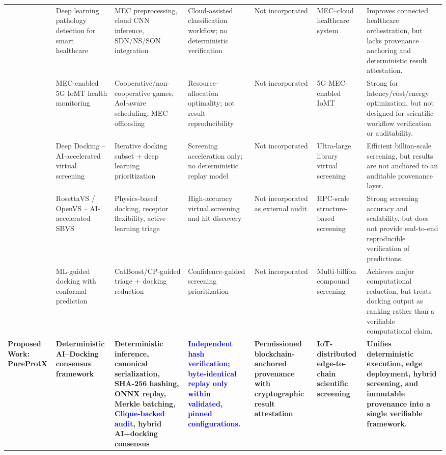 \documentclass[conference]{IEEEtran}
\newcommand{\rev}[2]{\textcolor{blue}{#2}}
\begin{document}
\begin{table}[!htbp]
{\begin{tabular}{p{1.5cm} p{3.5cm} p{3.5cm} p{2.4cm} p{2.9cm} p{2.9cm} p{3.8cm}}
\cite{hossain2020deep} & Deep learning pathology detection for smart healthcare & MEC preprocessing, cloud CNN inference, SDN/NS/SON integration & Cloud-assisted classification workflow; no deterministic verification & Not incorporated & MEC--cloud healthcare system & Improves connected healthcare orchestration, but lacks provenance anchoring and deterministic result attestation. \\

\cite{ning2020mobile} & MEC-enabled 5G IoMT health monitoring & Cooperative/non-cooperative games, AoI-aware scheduling, MEC offloading & Resource-allocation optimality; not result reproducibility & Not incorporated & 5G MEC-enabled IoMT & Strong for latency/cost/energy optimization, but not designed for scientific workflow verification or auditability. \\

\cite{gentile2022artificial} & Deep Docking -- AI-accelerated virtual screening & Iterative docking subset + deep learning prioritization & Screening acceleration only; no deterministic replay model & Not incorporated & Ultra-large library virtual screening & Efficient billion-scale screening, but results are not anchored to an auditable provenance layer. \\

\cite{zhou2024artificial} & RosettaVS / OpenVS -- AI-accelerated SBVS & Physics-based docking, receptor flexibility, active learning triage & High-accuracy virtual screening and hit discovery & Not incorporated as external audit & HPC-scale structure-based screening & Strong screening accuracy and scalability, but does not provide end-to-end reproducible verification of predictions. \\

\cite{luttens2025rapid} & ML-guided docking with conformal prediction & CatBoost/CP-guided triage + docking reduction & Confidence-guided screening prioritization & Not incorporated & Multi-billion compound screening & Achieves major computational reduction, but treats docking output as ranking rather than a verifiable computational claim. \\

\textbf{Proposed Work: PureProtX} & \textbf{Deterministic AI--Docking consensus framework} & \textbf{Deterministic inference, canonical serialization, SHA-256 hashing, ONNX replay, Merkle batching, \rev{R2.4}{Clique-backed audit}, hybrid AI+docking consensus} & \textbf{\textcolor{black}{\rev{R1.1}{Independent hash verification; byte-identical replay only within validated, pinned configurations.}}} & \textbf{Permissioned blockchain-anchored provenance with cryptographic result attestation} & \textbf{IoT-distributed edge-to-chain scientific screening} & \textbf{Unifies deterministic execution, edge deployment, hybrid screening, and immutable provenance into a single verifiable framework.} \\

\hline
\end{tabular}
}
\end{table}
\end{document}
